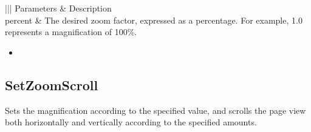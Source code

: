 \documentclass[letterpaper,12pt,english,openany,oneside]{sphinxmanual}
\begin{document}

\begin{sphinxVerbatim}[commandchars=\\\{\}]
  
\end{sphinxVerbatim}
\label{\detokenize{IAC_API_OLE_Objects:parameters-94}}


\begin{savenotes}\sphinxattablestart
\centering
{}\label{\detokenize{IAC_API_OLE_Objects:section-109}}\nobreak
\begin{tabular}[t]{|||}
\hline
\sphinxstyletheadfamily 
Parameters
&\sphinxstyletheadfamily 
Description
\\
\hline
percent
&
The desired zoom factor, expressed as a percentage. For example, 1.0 represents a magnification of 100\%.
\\
\hline
\end{tabular}
\par
\sphinxattableend\end{savenotes}
\label{\detokenize{IAC_API_OLE_Objects:related-methods-155}}
\begin{itemize}
\item {} 
 

\end{itemize}




\subsection{SetZoomScroll}
\label{\detokenize{IAC_API_OLE_Objects:setzoomscroll}}
Sets the magnification according to the specified value, and scrolls the page view both horizontally and vertically according to the specified amounts.


\begin{sphinxVerbatim}[commandchars=\\\{\}]
      
\end{sphinxVerbatim}
\label{\detokenize{IAC_API_OLE_Objects:parameters-95}}
\end{document}
